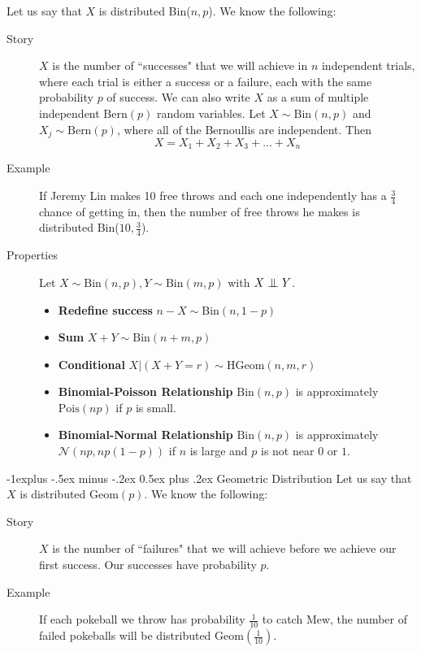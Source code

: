 \documentclass[6pt,landscape]{article}
\makeatletter
\newcommand\independent{\protect\mathpalette{\protect\independenT}{\perp}}
\def\independenT#1#2{\mathrel{\setbox0\hbox{$#1#2$}%
    \copy0\kern-\wd0\mkern4mu\box0}}
\renewcommand{\N}{\mathcal{N}}
\newcommand{\Bern}{\textrm{Bern}}
\newcommand{\Bin}{\textrm{Bin}}
\newcommand{\Pois}{\textrm{Pois}}
\newcommand{\Geom}{\textrm{Geom}}
\newcommand{\HGeom}{\textrm{HGeom}}
\renewcommand{\subsection}{\@startsection{subsection}{2}{0mm}%
                                {-1explus -.5ex minus -.2ex}%
                                {0.5ex plus .2ex}%
                                {\normalfont\normalsize\bfseries}}
\makeatother
\begin{document}
\begin{multicols*}{3}
Let us say that $X$ is distributed \Bin($n,p$). We know the following:
\begin{description}
    \item[Story] $X$ is the number of ``successes" that we will achieve in $n$ independent trials, where each trial is either a success or a failure, each with the same probability $p$ of success. We can also write $X$ as a sum of multiple independent $\Bern(p)$ random variables. Let $X \sim \Bin(n, p)$ and $X_j \sim \Bern(p)$, where all of the Bernoullis are independent. Then
        \[X = X_1 + X_2 + X_3 + \dots + X_n\]
    \item[Example] If Jeremy Lin makes 10 free throws and each one independently has a $\frac{3}{4}$ chance of getting in, then the number of free throws he makes is distributed  \Bin($10,\frac{3}{4}$).
\item[Properties] Let $X \sim \Bin(n,p), Y \sim \Bin(m,p)$ with $X \independent Y$.
\begin{itemize}
\item \textbf{Redefine success} $n-X \sim \Bin(n,1-p)$
\item \textbf{Sum} $X+Y \sim \Bin(n+m,p)$
\item \textbf{Conditional} $X|(X+Y=r) \sim \HGeom(n,m,r)$
 \item \textbf{Binomial-Poisson Relationship} $\Bin(n, p)$ is approximately  $\Pois(np)$ if $p$ is small.
   \item \textbf{Binomial-Normal Relationship} $\Bin(n, p)$ is approximately $\N(np,np(1-p))$ if $n$ is large and $p$ is not near $0$ or $1$.
  \end{itemize}
\end{description}

\subsection{Geometric Distribution} Let us say that $X$ is distributed $\Geom(p)$. We know the following:
\begin{description}
    \item[Story] $X$ is the number of ``failures" that we will achieve before we achieve our first success. Our successes have probability $p$.
    \item[Example] If each pokeball we throw has probability  $\frac{1}{10}$ to catch Mew, the number of failed pokeballs will be distributed $\Geom(\frac{1}{10})$.
\end{description}


\end{multicols*}
\end{document}
